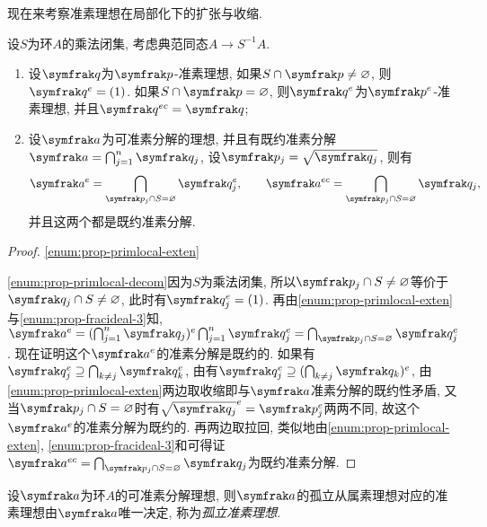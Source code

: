 现在来考察准素理想在局部化下的扩张与收缩.

\begin{proposition}\label{prop:primlocal}设$S$为环$A$的乘法闭集, 考虑典范同态$A\to S^{-1}A$.
  \begin{enumerate}
    \item\label{enum:prop-primlocal-exten} 设$\ideal{q}$为$\ideal{p}$-准素理想, 如果$S\cap\ideal{p}\neq\varnothing$, 则$\ideal{q}^e=(1)$. 如果$S\cap\ideal{p}=\varnothing$, 则$\ideal{q}^e$为$\ideal{p}^e$-准素理想, 并且$\ideal{q}^{ec}=\ideal{q}$;
    \item\label{enum:prop-primlocal-decom} 设$\ideal{a}$为可准素分解的理想, 并且有既约准素分解$\ideal{a}=\bigcap_{j=1}^n\ideal{q}_j$, 设$\ideal{p}_j=\sqrt{\ideal{q}_j}$, 则有
    \begin{equation*}
      \ideal{a}^{e}=\bigcap_{\ideal{p}_j\cap S=\varnothing}\ideal{q}_j^e,
      \qquad \ideal{a}^{ec}=\bigcap_{\ideal{p}_j\cap S=\varnothing}\ideal{q}_j,
    \end{equation*}
    并且这两个都是既约准素分解.
  \end{enumerate}
\end{proposition}

\begin{proof}
  \ref{enum:prop-primlocal-exten}%

  \ref{enum:prop-primlocal-decom}因为$S$为乘法闭集, 所以$\ideal{p}_j\cap S\neq\varnothing$等价于$\ideal{q}_j\cap S\neq\varnothing$, 此时有$\ideal{q}_j^e=(1)$. 再由\ref{enum:prop-primlocal-exten}与\ref{enum:prop-fracideal-3}知, $\ideal{a}^e=(\bigcap_{j=1}^n\ideal{q}_j)^e\bigcap_{j=1}^n\ideal{q}_j^e=\bigcap_{\ideal{p}_j\cap S=\varnothing}\ideal{q}_j^e$. 现在证明这个$\ideal{a}^e$的准素分解是既约的. 如果有$\ideal{q}_j^e\supseteq\bigcap_{k\neq j}\ideal{q}_k^e$, 由有$\ideal{q}_j^e\supseteq(\bigcap_{k\neq j}\ideal{q}_k)^e$, 由\ref{enum:prop-primlocal-exten}两边取收缩即与$\ideal{a}$准素分解的既约性矛盾, 又当$\ideal{p}_j\cap S=\varnothing$时有$\sqrt{\ideal{q}_j}^e=\ideal{p}_j^e$两两不同, 故这个$\ideal{a}^e$的准素分解为既约的. 再两边取拉回, 类似地由\ref{enum:prop-primlocal-exten}, \ref{enum:prop-fracideal-3}和可得证$\ideal{a}^{ec}=\bigcap_{\ideal{p}_j\cap S=\varnothing}\ideal{q}_j$为既约准素分解.
\end{proof}

\begin{theorem}
  设$\ideal{a}$为环$A$的可准素分解理想, 则$\ideal{a}$的孤立从属素理想对应的准素理想由$\ideal{a}$唯一决定, 称为\emph{孤立准素理想}.
\end{theorem}

